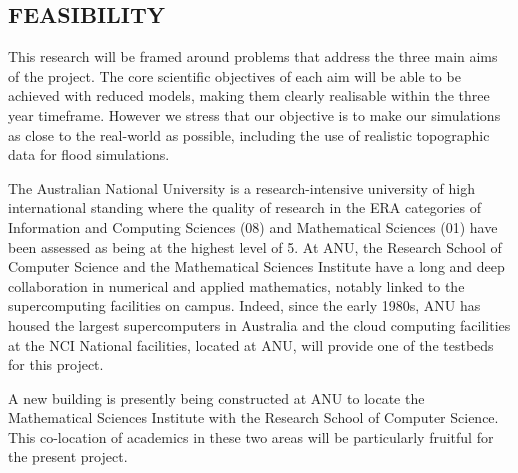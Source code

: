 \iffalse
\subsection*{RESEARCH ENVIRONMENT}
\fi

\subsection*{FEASIBILITY}

\iffalse The project is feasible due to the rigorous design with distinct tasks
and timelines which address the identified, well understood challenges
in this discipline. 
\fi

\iffalse
The project brings together a multi-disciplinary
team of experts in mathematics, software engineering, human computer interaction and high
performance computing.
\fi

This research will be framed around problems that address the three main aims of the project. The core scientific objectives of each aim will be able to be achieved with reduced models, making them clearly realisable within the three year timeframe. However we stress that our objective is to make our simulations as close to the real-world as possible, including the use of realistic topographic data for flood simulations.




The Australian National University is a research-intensive university
of high international standing where the quality of research in the ERA categories of 
 Information and Computing
Sciences (08) and Mathematical Sciences (01) have been assessed as
being at the highest level of 5. At ANU, the Research School of
Computer Science and the Mathematical Sciences Institute have a long
and deep collaboration in numerical and applied mathematics, notably  linked to the supercomputing
facilities on campus. Indeed, since the early 1980s, ANU has housed the
largest supercomputers in Australia and the cloud computing facilities at the NCI National
facilities, located at ANU, will provide one of the testbeds for this
project.

A new building is presently being constructed at ANU to
locate the Mathematical Sciences Institute with the Research
School of Computer Science. This co-location of academics in these two
areas will be particularly fruitful for the present project.
